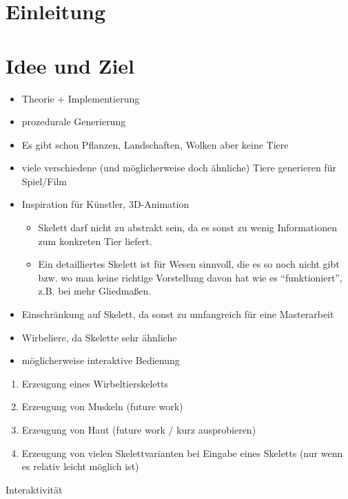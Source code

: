 \chapter{Einleitung}


\chapter{Idee und Ziel}

\begin{itemize}
 \item Theorie + Implementierung
 \item prozedurale Generierung
 \item Es gibt schon Pflanzen, Landschaften, Wolken \etc aber keine Tiere
 \item viele verschiedene (und möglicherweise doch ähnliche) Tiere generieren für Spiel/Film
 \item Inspiration für Künstler, 3D-Animation
    \begin{itemize}
     \item Skelett darf nicht zu abstrakt sein, da es sonst zu wenig Informationen zum konkreten Tier liefert.
     \item Ein detailliertes Skelett ist für Wesen sinnvoll, die es so noch nicht gibt bzw. wo man keine richtige Vorstellung davon hat wie es "`funktioniert"', z.B. bei mehr Gliedmaßen.
    \end{itemize}
 \item Einschränkung auf Skelett, da sonst zu umfangreich für eine Masterarbeit
 \item Wirbeliere, da Skelette sehr ähnliche
 \item möglicherweise interaktive Bedienung
\end{itemize}

\begin{enumerate}
 \item Erzeugung eines Wirbeltierskeletts
 \item Erzeugung von Muskeln (future work)
 \item Erzeugung von Haut (future work / kurz ausprobieren)
 \item Erzeugung von vielen Skelettvarianten bei Eingabe eines Skeletts (nur wenn es relativ leicht möglich ist)
\end{enumerate}

Interaktivität

